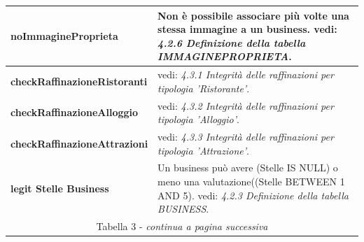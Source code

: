 \documentclass[a4paper,12pt]{article}
\begin{document}
\begin{flushleft}
\begin{table}[htbp]
\begin{tabular}[c]{| m{6cm} | m{10cm} |}
{\bf noImmagineProprieta}
&\small Non è possibile associare più volte una stessa immagine a un business.
vedi: {\it 4.2.6 Definizione della tabella IMMAGINEPROPRIETA}.
\\
\hline

{\bf checkRaffinazioneRistoranti}
&\small vedi: {\it 4.3.1 Integrità delle raffinazioni per tipologia 'Ristorante'}.
\\
\hline

{\bf checkRaffinazioneAlloggio}
&\small vedi: {\it 4.3.2 Integrità delle raffinazioni per tipologia 'Alloggio'}.
\\
\hline

{\bf checkRaffinazioneAttrazioni}
&\small vedi: {\it 4.3.3 Integrità delle raffinazioni per tipologia 'Attrazione'}.
\\
\hline

{\bf legit Stelle Business}
&\small Un business può avere (Stelle IS NULL) o meno una valutazione((Stelle BETWEEN 1 AND 5).
vedi: {\it 4.2.3 Definizione della tabella BUSINESS}.
\\
\hline

\multicolumn{2}{c}{\footnotesize{\normalsize *Tabella 3 - {\it continua a pagina successiva}}}
\end{tabular}
\end{table}
\end{flushleft}
\newpage
\end{document}
